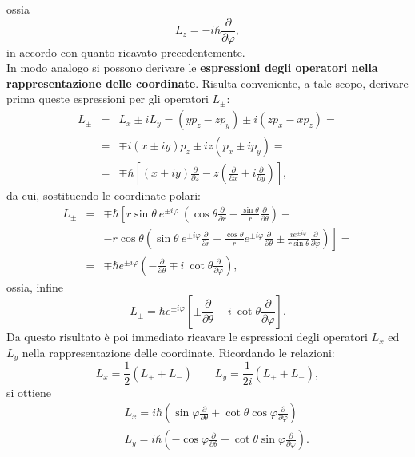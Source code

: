 \documentclass[a4paper,12pt,oneside]{book}
\begin{document}
ossia
\begin{equation}
L_z = -i\hbar \frac{\partial}{\partial \varphi},
\end{equation}
in accordo con quanto ricavato precedentemente.\\
In modo analogo si possono derivare le \textbf{espressioni degli operatori nella rappresentazione delle coordinate}. Risulta conveniente, a tale scopo, derivare prima queste espressioni per gli operatori $L_{\pm}$:
\begin{eqnarray}
L_{\pm} &=& L_x \pm iL_y = (yp_z-zp_y) \pm i(zp_x-xp_z)= \nonumber \\
&=& \mp i (x\pm iy)p_z \pm iz(p_x\pm ip_y)= \nonumber \\
&=&\mp \hbar \left[ \left(x\pm i y\right) \frac{\partial}{\partial z}- z \left( \frac{\partial}{\partial x}\pm i\frac{\partial}{\partial y}\right) \right] ,
\end{eqnarray}
da cui, sostituendo le coordinate polari:
\begin{eqnarray}
L_{\pm} &=&\mp \hbar \left[ r\sin \theta\ e^{\pm i \varphi}\ \left( \cos \theta\frac{\partial}{\partial r} -\frac{\sin \theta}{r}\frac{\partial}{\partial \theta} \right)- \right. \nonumber \\
& &\left. - r\cos \theta \left( \sin \theta\ e^{\pm i \varphi}\frac{\partial}{\partial r}+\frac{\cos \theta}{r} e^{\pm i \varphi}\frac{\partial}{\partial \theta}\pm\frac{i e^{\pm i \varphi}}{r\sin \theta}\frac{\partial}{\partial \varphi} \right)\right]= \nonumber \\
&=& \mp \hbar e^{\pm i \varphi}\left(-\frac{\partial}{\partial \theta}\mp i\ \cot \theta\frac{\partial}{\partial \varphi}\right) ,
\end{eqnarray}
ossia, infine
\begin{equation}
L_{\pm}=\hbar e^{\pm i \varphi}\left[\pm \frac{\partial}{\partial \theta}+ i\ \cot \theta\frac{\partial}{\partial \varphi}\right] .
\label{eq:cap17_5}
\end{equation}
Da questo risultato è poi immediato ricavare le espressioni degli operatori $L_x$ ed $L_y$ nella rappresentazione delle coordinate. Ricordando le relazioni:
\begin{equation}
L_x = \frac{1}{2} (L_+ + L_-) \qquad L_y = \frac{1}{2i} (L_+ + L_-),
\end{equation}
si ottiene
\begin{eqnarray}
& &L_x =i\hbar \left( \sin \varphi \frac{\partial}{\partial \theta}+\cot \theta \cos \varphi \frac{\partial}{\partial \varphi}\right)\\
& &L_y =i\hbar \left(- \cos \varphi \frac{\partial}{\partial \theta}+\cot \theta \sin \varphi \frac{\partial}{\partial \varphi}\right) .
\end{eqnarray}
\end{document}
